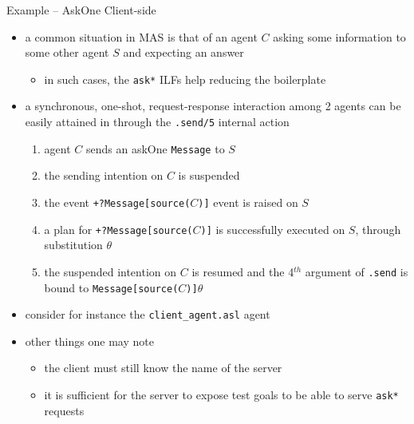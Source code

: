 \documentclass[presentation]{beamer}\mode<presentation>{\usetheme{AMSBolognaFC}}
\begin{document}
\begin{frame}[c, allowframebreaks]{Example \theJasonExample{} -- AskOne Client-side}
\begin{itemize}
    
    \item a common situation in MAS is that of an agent $C$ asking some information to some other agent $S$ and expecting an answer
    \begin{itemize}
        \item in such cases, the \texttt{\texttt{ask*}} ILFs help reducing the boilerplate
    \end{itemize}
    
    \vspace{.3cm}
    
    \item a synchronous, one-shot, request-response interaction among 2 agents can be easily attained in \jason{} through the \texttt{.send/5} internal action
    \begin{enumerate}
        \item agent $C$ sends an \alert{askOne} \texttt{Message} to $S$
        \item the sending intention on $C$ is suspended 
        \item the event \texttt{+?Message[source($C$)]} event is raised on $S$
        \item a plan for \texttt{+?Message[source($C$)]} is successfully executed on $S$, through substitution $\theta$
        \item the suspended intention on $C$ is resumed and the 4$^{th}$ argument of \texttt{.send} is bound to \texttt{Message[source($C$)]$\theta$}
     \end{enumerate}
    
    \framebreak
    
    \item consider for instance the \texttt{client\_agent.asl} agent
    
    
    \framebreak
    
    \item other things one may note
    \begin{itemize}
        \item the client must still know the name of the server
        \item it is sufficient for the server to expose test goals to be able to serve \texttt{ask*} requests
    \end{itemize}
    

\end{itemize}
\end{frame}
\end{document}

